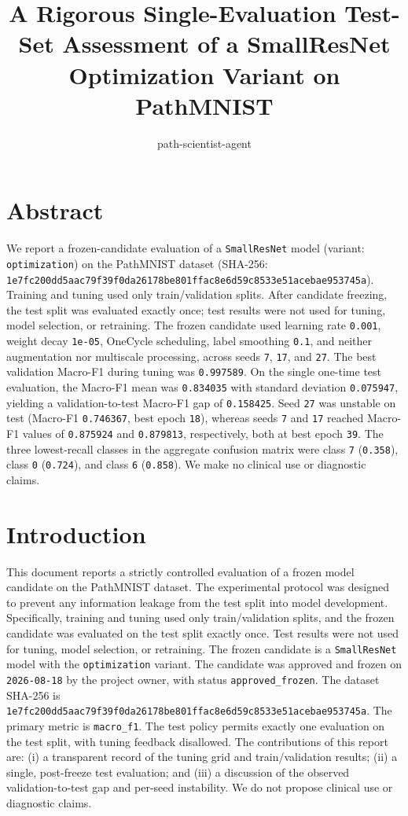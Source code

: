\documentclass[10pt]{article}
\title{A Rigorous Single-Evaluation Test-Set Assessment of a SmallResNet Optimization Variant on PathMNIST}
\author{path-scientist-agent}
\date{}
\begin{document}
\maketitle

\section{Abstract}
We report a frozen-candidate evaluation of a \texttt{SmallResNet} model (variant: \texttt{optimization}) on the PathMNIST dataset (SHA-256: \texttt{1e7fc200dd5aac79f39f0da26178be801ffac8e6d59c8533e51acebae953745a}). Training and tuning used only train/validation splits. After candidate freezing, the test split was evaluated exactly once; test results were not used for tuning, model selection, or retraining. The frozen candidate used learning rate \texttt{0.001}, weight decay \texttt{1e-05}, OneCycle scheduling, label smoothing \texttt{0.1}, and neither augmentation nor multiscale processing, across seeds \texttt{7}, \texttt{17}, and \texttt{27}. The best validation Macro-F1 during tuning was \texttt{0.997589}. On the single one-time test evaluation, the Macro-F1 mean was \texttt{0.834035} with standard deviation \texttt{0.075947}, yielding a validation-to-test Macro-F1 gap of \texttt{0.158425}. Seed \texttt{27} was unstable on test (Macro-F1 \texttt{0.746367}, best epoch \texttt{18}), whereas seeds \texttt{7} and \texttt{17} reached Macro-F1 values of \texttt{0.875924} and \texttt{0.879813}, respectively, both at best epoch \texttt{39}. The three lowest-recall classes in the aggregate confusion matrix were class \texttt{7} (\texttt{0.358}), class \texttt{0} (\texttt{0.724}), and class \texttt{6} (\texttt{0.858}). We make no clinical use or diagnostic claims.
\section{Introduction}
This document reports a strictly controlled evaluation of a frozen model candidate on the PathMNIST dataset. The experimental protocol was designed to prevent any information leakage from the test split into model development. Specifically, training and tuning used only train/validation splits, and the frozen candidate was evaluated on the test split exactly once. Test results were not used for tuning, model selection, or retraining.
The frozen candidate is a \texttt{SmallResNet} model with the \texttt{optimization} variant. The candidate was approved and frozen on \texttt{2026-08-18} by the project owner, with status \texttt{approved\_frozen}. The dataset SHA-256 is \texttt{1e7fc200dd5aac79f39f0da26178be801ffac8e6d59c8533e51acebae953745a}. The primary metric is \texttt{macro\_f1}. The test policy permits exactly one evaluation on the test split, with tuning feedback disallowed.
The contributions of this report are: (i) a transparent record of the tuning grid and train/validation results; (ii) a single, post-freeze test evaluation; and (iii) a discussion of the observed validation-to-test gap and per-seed instability. We do not propose clinical use or diagnostic claims.
\end{document}
